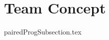\documentclass[class=book , crop=false]{standalone}
\begin{document}
	\section{Team Concept}

		{pairedProgSubsection.tex}
		
\end{document}
